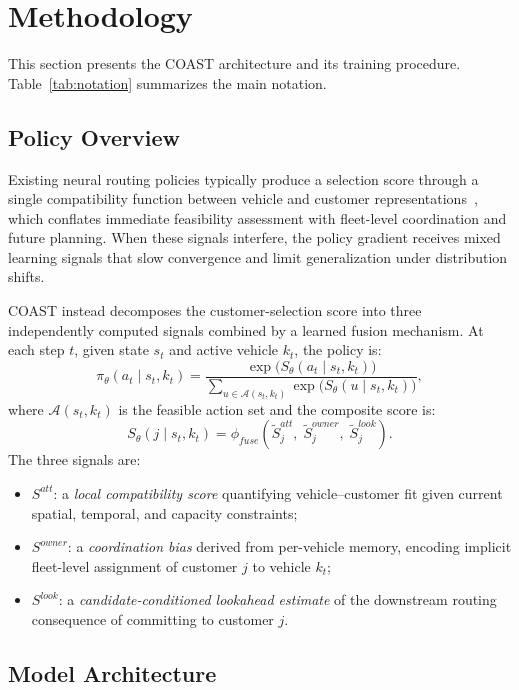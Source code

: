 \section{Methodology}\label{sec:method}

This section presents the COAST architecture and its training procedure.
Table~\ref{tab:notation} summarizes the main notation.

\subsection{Policy Overview}\label{sec:policy_overview}

Existing neural routing policies typically produce a selection score through a single compatibility function between vehicle and customer representations~\cite{kool2019attention}, which conflates immediate feasibility assessment with fleet-level coordination and future planning.
When these signals interfere, the policy gradient receives mixed learning signals that slow convergence and limit generalization under distribution shifts.

COAST instead decomposes the customer-selection score into three independently computed signals combined by a learned fusion mechanism.
At each step $t$, given state $s_t$ and active vehicle $k_t$, the policy is:
\[
\pi_\theta(a_t \mid s_t, k_t)
=
\frac{\exp\!\big(S_\theta(a_t \mid s_t, k_t)\big)}
{\displaystyle\sum_{u \in \mathcal{A}(s_t, k_t)} \exp\!\big(S_\theta(u \mid s_t, k_t)\big)},
\]
where $\mathcal{A}(s_t, k_t)$ is the feasible action set and the composite score is:
\[
S_\theta(j \mid s_t, k_t) = \phi_{fuse}\!\left(\tilde{S}^{att}_j,\; \tilde{S}^{owner}_j,\; \tilde{S}^{look}_j\right).
\]
The three signals are:
\begin{itemize}
    \item $S^{att}$: a \textit{local compatibility score} quantifying vehicle--customer fit given current spatial, temporal, and capacity constraints;
    \item $S^{owner}$: a \textit{coordination bias} derived from per-vehicle memory, encoding implicit fleet-level assignment of customer $j$ to vehicle $k_t$;
    \item $S^{look}$: a \textit{candidate-conditioned lookahead estimate} of the downstream routing consequence of committing to customer $j$.
\end{itemize}

\subsection{Model Architecture}\label{sec:model_architecture}

